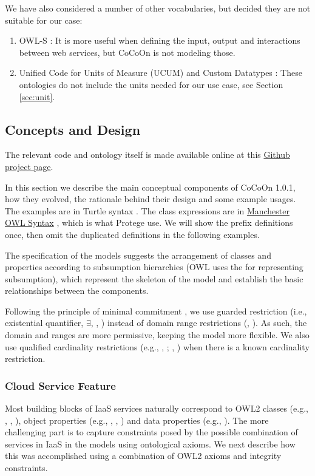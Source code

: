 We have also considered a number of other vocabularies, but decided they are not suitable for our case:
\begin{enumerate}
  \item OWL-S \cite{OWL-S}: It is more useful when defining the input, output and interactions between web services, but CoCoOn is not modeling those.
  \item Unified Code for Units of Measure (UCUM) \cite{UCUM} and Custom Datatypes \cite{CDT}: These ontologies do not include the units needed for our use case, see Section \ref{sec:unit}.
\end{enumerate}

\subsection{Concepts and Design}
\label{sec:CoCoOnextended}
The relevant code and ontology itself is made available online at this
\href{https://github.com/miranda-zhang/cloud-computing-schema}{Github project page}.

In this section we describe the main conceptual components of CoCoOn 1.0.1,
how they evolved, the rationale behind their design and some example usages.
The examples are in Turtle syntax \cite{turtle}. 
The class expressions are in
\href{http://protegeproject.github.io/protege/class-expression-syntax/}{Manchester OWL Syntax}
\cite{ManchesterOWLSyntax},
which is what Protege \cite{Protege} use.
We will show the prefix definitions once,
then omit the duplicated definitions in the following examples.

The specification of the models suggests the arrangement of classes and properties according to subsumption hierarchies
(OWL uses the  for representing subsumption),
which represent the skeleton of the model and establish the basic relationships between the components.

Following the principle of minimal commitment \cite{principles_for_minimal_commitments},
we use guarded restriction (i.e., existential quantifier, $\exists$,
, )
instead of domain range restrictions (, ).
As such, the domain and ranges are more permissive,
keeping the model more flexible.
We also use qualified cardinality restrictions
(e.g., , ;
, ) when there
is a known cardinality restriction.

\subsubsection{Cloud Service Feature}
Most building blocks of IaaS services naturally correspond to OWL2 classes 
(e.g., , , ), object properties (e.g., , , )
and data properties (e.g., ).
The more challenging part is to capture constraints posed by the possible combination of services in IaaS in the models using ontological axioms.
We next describe how this was accomplished using a combination of OWL2 axioms and integrity constraints.

